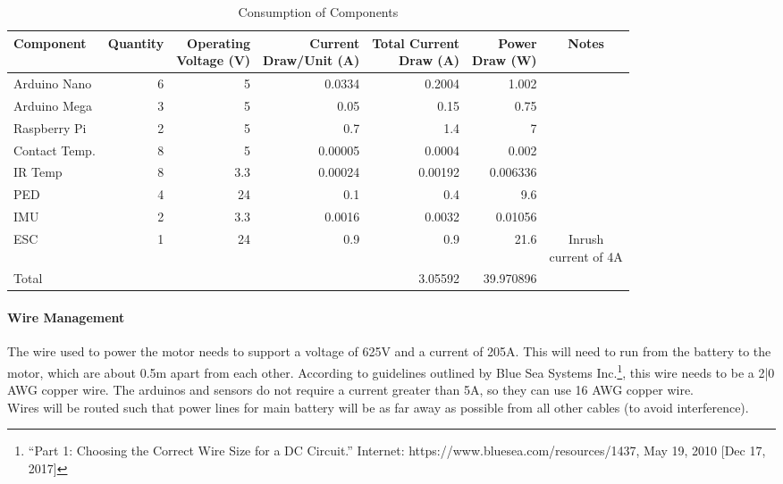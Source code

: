 \documentclass[main.tex]{subfiles}
\begin{document}
    \begin{table}[H]
        \centering
        \begin{tabular}{@{}lrrrrrc@{}} \toprule
            Component & Quantity & \makecell{Operating \\ Voltage (V)} & \makecell{Current \\ Draw/Unit (A)} & \makecell{Total Current \\ Draw (A)} & \makecell{Power \\ Draw (W)} & Notes\\ \midrule
            Arduino Nano & 6 & 5 & 0.0334 & 0.2004 & 1.002 &\\
            Arduino Mega & 3 & 5 & 0.05 & 0.15 & 0.75 &\\
            Raspberry Pi & 2 & 5 & 0.7 & 1.4 & 7 &\\
            Contact Temp. & 8 & 5 & 0.00005 & 0.0004 & 0.002 &\\
            IR Temp & 8 & 3.3 & 0.00024 & 0.00192 & 0.006336 &\\
            PED & 4 & 24 & 0.1 & 0.4 & 9.6 &\\
            IMU & 2 & 3.3 & 0.0016 & 0.0032 & 0.01056 &\\
            ESC & 1 & 24 & 0.9 & 0.9 & 21.6 & \makecell{Inrush \\ current of 4A}\\ \midrule
            Total & & & & 3.05592 & 39.970896 &\\ \bottomrule
        \end{tabular}
        \caption{Consumption of Components}
    \end{table}
    \paragraph{Wire Management}
    The wire used to power the motor needs to support a voltage of 625V and a current of 205A. This will need to run from the battery to the motor, which are about 0.5m apart from each other. According to guidelines outlined by Blue Sea Systems Inc.\footnote{“Part 1: Choosing the Correct Wire Size for a DC Circuit.” Internet: https://www.bluesea.com/resources/1437, May 19, 2010 [Dec 17, 2017]}, this wire needs to be a 2|0 AWG copper wire. The arduinos and sensors do not require a current greater than 5A, so they can use 16 AWG copper wire.\\

    Wires will be routed such that power lines for main battery will be as far away as possible from all other cables (to avoid interference).
\end{document}
